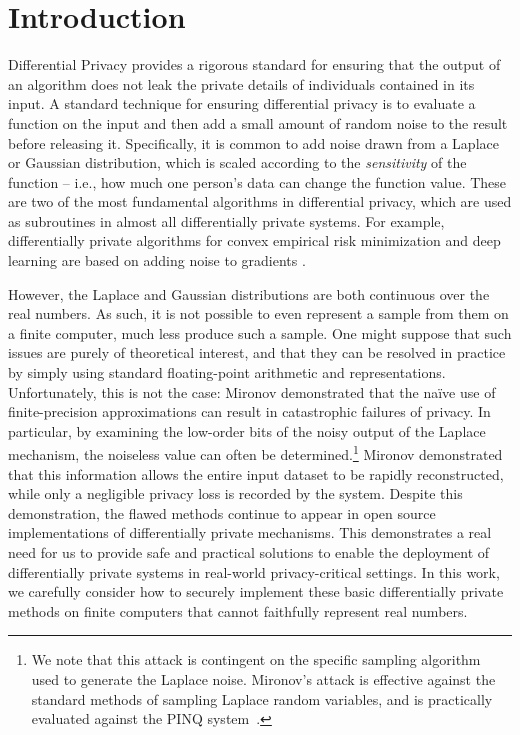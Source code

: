\documentclass{jpcfinal} %
\begin{document}
\maketitle

\section{Introduction}
Differential Privacy \citep{DworkMNS06} provides a rigorous standard for ensuring that the output of an algorithm does not leak the private details of individuals contained in its input. A standard technique for ensuring differential privacy is to evaluate a function on the input and then add a small amount of random noise to the result before releasing it. Specifically, it is common to add noise drawn from a Laplace or Gaussian distribution, which is scaled according to the \emph{sensitivity} of the function -- i.e., how much one person's data can change the function value. These are two of the most fundamental algorithms in differential privacy, which are used as subroutines in almost all differentially private systems. For example, differentially private algorithms for convex empirical risk minimization and deep learning are based on adding noise to gradients \citep{BassilyST14,AbadiCGMMTZ16}.

However, the Laplace and Gaussian distributions are both continuous over the real numbers. As such, it is not possible to even represent a sample from them on a finite computer, much less produce such a sample. One might suppose that such issues are purely of theoretical interest, and that they can be resolved in practice by simply using standard floating-point arithmetic and representations. Unfortunately, this is not the case: Mironov \cite{Mironov12} demonstrated that the na\"ive use of finite-precision approximations can result in catastrophic failures of privacy. In particular, by examining the low-order bits of the noisy output of the Laplace mechanism, the noiseless value can often be determined.\footnote{We note that this attack is contingent on the specific sampling algorithm used to generate the Laplace noise. Mironov's attack is effective 
 against the standard methods of sampling Laplace random variables, and is practically evaluated against the PINQ system~\cite{McSherry09}.} Mironov demonstrated that this information allows the entire input dataset to be rapidly reconstructed, while only a negligible privacy loss is recorded by the system. 
Despite this demonstration, the flawed methods continue to appear in open source implementations of differentially private mechanisms. This demonstrates a real need for us to provide safe and practical solutions to enable the deployment of differentially private systems in real-world privacy-critical settings. In this work, we carefully consider how to securely implement these basic differentially private methods on finite computers that cannot faithfully represent real numbers. 
\end{document}
